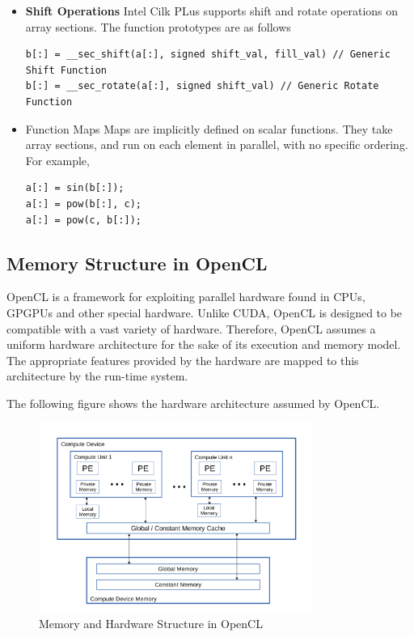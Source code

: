 \documentclass[]{scrartcl}
\begin{document}
\begin{itemize}
	\item \textbf{Shift Operations}
	Intel Cilk PLus supports shift and rotate operations on array sections. The function
	prototypes are as follows
	
	\begin{lstlisting}
b[:] = __sec_shift(a[:], signed shift_val, fill_val) // Generic Shift Function
b[:] = __sec_rotate(a[:], signed shift_val) // Generic Rotate Function
	\end{lstlisting}
	
	\item Function Maps
	Maps are implicitly defined on scalar functions. They take array sections, and run on
	each element in parallel, with no specific ordering. For example,
	
	\begin{lstlisting}
a[:] = sin(b[:]);
a[:] = pow(b[:], c);
a[:] = pow(c, b[:]);
	\end{lstlisting}
\end{itemize}
	
\pagebreak
\subsection{Memory Structure in OpenCL}
OpenCL is a framework for exploiting parallel hardware found in CPUs, GPGPUs and
other special hardware. Unlike CUDA, OpenCL is designed to be compatible with a vast
variety of hardware. Therefore, OpenCL assumes a uniform hardware architecture for
the sake of its execution and memory model. The appropriate features provided by the
hardware are mapped to this architecture by the run-time system.

The following figure shows the hardware architecture assumed by OpenCL.

\begin{figure}[hb]
	\centering
	\includegraphics[width=0.8\textwidth]{opencl_memory}
	\caption{Memory and Hardware Structure in OpenCL}
\end{figure}
\end{document}
